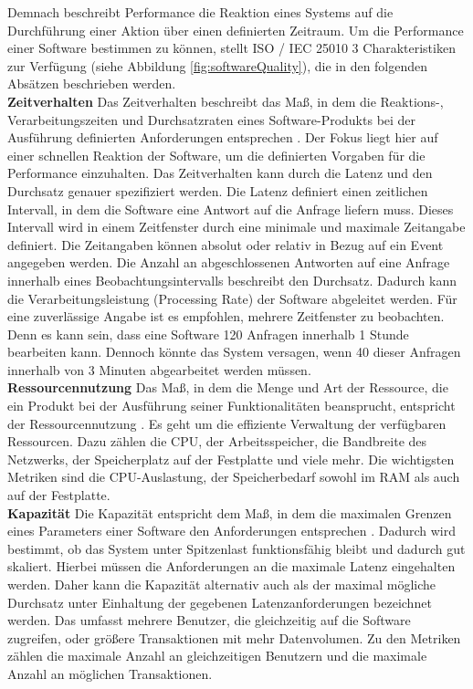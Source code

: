 \noindent
Demnach beschreibt Performance die Reaktion eines Systems auf die Durchführung einer Aktion über einen definierten Zeitraum. Um die Performance einer Software bestimmen zu können, stellt ISO / IEC 25010 3 Charakteristiken zur Verfügung (siehe Abbildung \ref{fig:softwareQuality}), die in den folgenden Absätzen beschrieben werden.\\

\noindent
\textbf{Zeitverhalten}\newline
Das Zeitverhalten beschreibt das Maß, in dem die Reaktions-, Verarbeitungszeiten und Durchsatzraten eines Software-Produkts bei der Ausführung definierten Anforderungen entsprechen \cite{ISOIEC.}. Der Fokus liegt hier auf einer schnellen Reaktion der Software, um die definierten Vorgaben für die Performance einzuhalten. Das Zeitverhalten kann durch die Latenz und den Durchsatz genauer spezifiziert werden. Die Latenz definiert einen zeitlichen Intervall, in dem die Software eine Antwort auf die Anfrage liefern muss. Dieses Intervall wird in einem Zeitfenster durch eine minimale und maximale Zeitangabe definiert. Die Zeitangaben können absolut oder relativ in Bezug auf ein Event angegeben werden. Die Anzahl an abgeschlossenen Antworten auf eine Anfrage innerhalb eines Beobachtungsintervalls beschreibt den Durchsatz. Dadurch kann die Verarbeitungsleistung (Processing Rate) der Software abgeleitet werden. Für eine zuverlässige Angabe ist es empfohlen, mehrere Zeitfenster zu beobachten. Denn es kann sein, dass eine Software 120 Anfragen innerhalb 1 Stunde bearbeiten kann. Dennoch könnte das System versagen, wenn 40 dieser Anfragen innerhalb von 3 Minuten abgearbeitet werden müssen.\cite{Barbacci.1995}\\

\noindent
\textbf{Ressourcennutzung}\newline
Das Maß, in dem die Menge und Art der Ressource, die ein Produkt bei der Ausführung seiner Funktionalitäten beansprucht, entspricht der Ressourcennutzung \cite{ISOIEC.}. Es geht um die effiziente Verwaltung der verfügbaren Ressourcen. Dazu zählen die CPU, der Arbeitsspeicher, die Bandbreite des Netzwerks, der Speicherplatz auf der Festplatte und viele mehr. Die wichtigsten Metriken sind die CPU-Auslastung, der Speicherbedarf sowohl im RAM als auch auf der Festplatte.\cite{Barbacci.1995}\\

\noindent
\textbf{Kapazität}\newline
Die Kapazität entspricht dem Maß, in dem die maximalen Grenzen eines Parameters einer Software den Anforderungen entsprechen \cite{ISOIEC.}. Dadurch wird bestimmt, ob das System unter Spitzenlast funktionsfähig bleibt und dadurch gut skaliert. Hierbei müssen die Anforderungen an die maximale Latenz eingehalten werden. Daher kann die Kapazität alternativ auch als der maximal mögliche Durchsatz unter Einhaltung der gegebenen Latenzanforderungen bezeichnet werden. Das umfasst mehrere Benutzer, die gleichzeitig auf die Software zugreifen, oder größere Transaktionen mit mehr Datenvolumen. Zu den Metriken zählen die maximale Anzahl an gleichzeitigen Benutzern und die maximale Anzahl an möglichen Transaktionen.\cite{Barbacci.1995}